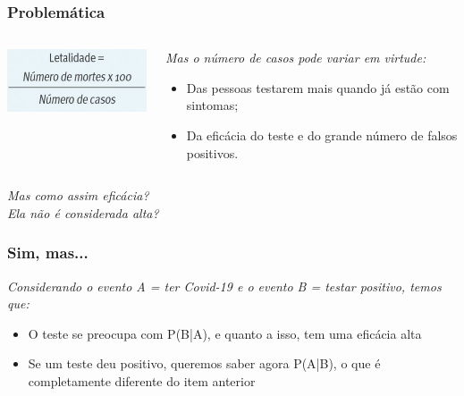 \documentclass[compress,12pt]{beamer}
\begin{document}
\begin{frame}
    \frametitle{Problemática}
    \centering
        \begin{columns}
        
            \centering
            
            \includegraphics[width=49mm]{Imagens/letalidadeFormula.jpg}
            
            \centering
            
            \begin{block}{}
                \textit{Mas o número de casos pode variar em virtude:} \\
                \begin{itemize}
                    \item Das pessoas testarem mais quando já estão com sintomas;
                    \item Da eficácia do teste e do grande número de falsos positivos.
                \end{itemize}
            \end{block}
        \end{columns}
\end{frame}

\begin{frame}
    \vfill
    \begin{center}
    \centering
    \vfill
    {\fontsize{20}{25}\textit{Mas como assim eficácia?\\Ela não é considerada alta?}}
    \vfill
    \end{center}
    \vfill
\end{frame}

\begin{frame}
    \frametitle{Sim, mas...}
    \textit{Considerando o evento A = ter Covid-19 e o evento B = testar positivo, temos que:}
    \begin{itemize}
        \item O teste se preocupa com P(B|A), e quanto a isso, tem uma eficácia alta
        \item Se um teste deu positivo, queremos saber agora P(A|B), o que é completamente diferente do item anterior
    \end{itemize}
\end{frame}
\end{document}

